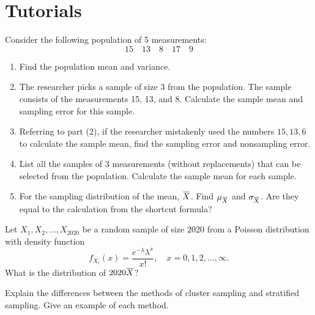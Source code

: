 \section*{Tutorials}

\begin{mdframed}
    \vspace{-0.25cm}
    \hspace{-0.25cm}
    \begin{Exercise}
    Consider the following population of 5 measurements:
    \[
        15\quad 13\quad 8\quad 17\quad 9
    \]
    \begin{enumerate}
        \item Find the population mean and variance.
        \item The researcher picks a sample of size 3 from the population. The sample 
        consists of the measurements 15, 13, and 8. Calculate the sample mean and sampling error 
        for this sample.
        \item Referring to part (2), if the researcher mistakenly used the numbers $15, 13, 6$ to calculate
        the sample mean, find the sampling error and nonsampling error.
        \item List all the samples of 3 measurements (without replacements) that can be selected from the population. 
        Calculate the sample mean for each sample.
        \item For the sampling distribution of the mean, $\ols{X}$. Find $\mu_{\ols{X}}$ and $\sigma_{\ols{X}}$. 
        Are they equal to the calculation from the shortcut formula?
    \end{enumerate}
    \end{Exercise}

    \vspace{0.752cm}
    \begin{Exercise}
        Let $X_1, X_2, \ldots, X_{2020}$ be a random sample of size $2020$ 
        from a Poisson distribution with density function
        \[
            f_{X_i}(x) = \frac{e^{-\lambda} \lambda^x}{x!}, \quad x = 0,1,2,\ldots,\infty.
        \]
        What is the distribution of $2020 \ols{X}$?
    \end{Exercise}

    \vspace{0.752cm}
    \begin{Exercise}
        Explain the differences between the methods 
        of cluster sampling and stratified sampling. 
        Give an example of each method.
    \end{Exercise}
\end{mdframed}
